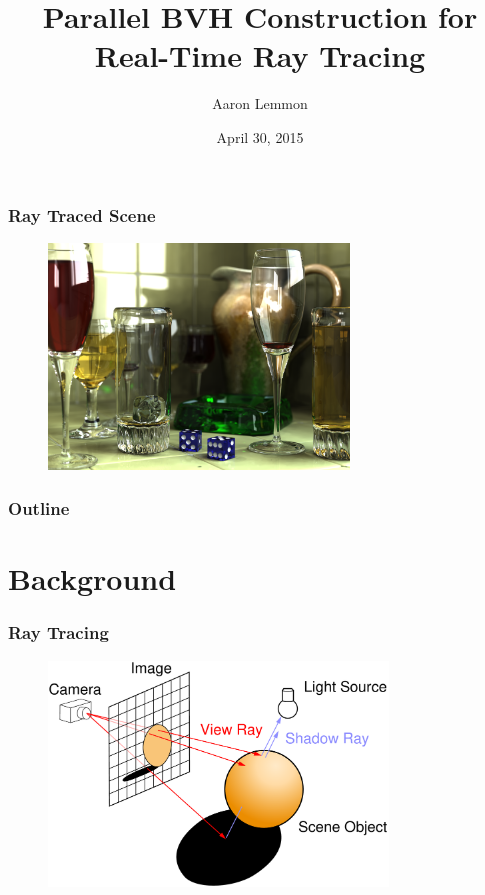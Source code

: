 \documentclass{beamer}
\begin{document}
\title{Parallel BVH Construction for Real-Time Ray Tracing}
\author{Aaron Lemmon}
\date[]  
{April 30, 2015}

\begin{frame}
  \titlepage
\end{frame}

\begin{frame}
  \frametitle{Ray Traced Scene}
\begin{figure}
\includegraphics[height=60mm]{Glasses_800_edit.png}
\end{figure}
\end{frame}

\begin{frame}

  \frametitle{Outline}
\tableofcontents
\end{frame}

\section{Background}

\begin{frame}
  \frametitle{Ray Tracing}
\begin{figure}
\includegraphics[height=60mm]{Ray_trace_diagram.pdf}
\end{figure}
\end{frame}
\end{document}
